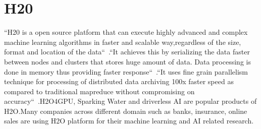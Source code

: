 \section{H20}


``H20 is a open source platform that can execute highly advanced 
and complex machine learning algorithms in faster and scalable 
way,regardless of the size, format and location of the 
data``~\cite{hid-sp18-523-www-h2o}.``It achieves this by serializing 
the data faster between nodes and clusters that stores huge amount 
of data. Data processing is done in memory thus providing faster 
response``~\cite{hid-sp18-523-www-h2o}.``It uses fine grain parallelism 
technique for processing of distributed data archiving 100x faster 
speed as compared to traditional mapreduce without compromising 
on accuracy``~\cite{hid-sp18-523-www-h2o}.H2O4GPU, Sparking Water
and driverless AI are popular products of H2O.Many companies
across different domain such as banks, insurance, online sales 
are using H2O platform for their machine learning and AI related
research.





